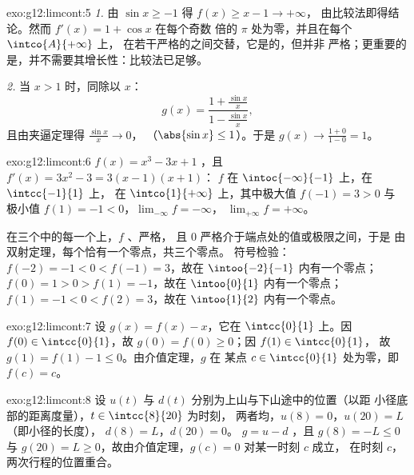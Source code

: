 \begin{solution}{exo:g12:limcont:5}
\emph{1.} 由 $\sin x \geq -1$ 得 $f(x) \geq x - 1 \to +\infty$，
由比较法即得结论。然而 $f'(x) = 1 + \cos x$ 在每个奇数
倍的 $\pi$ 处为零，并且在每个 $\intco{A}{+\infty}$ 上，
在若干严格的之间交替，它是的，但并非
严格；更重要的是，并不需要其增长性：比较法已足够。

\emph{2.} 当 $x > 1$ 时，同除以 $x$：
\[
g(x) = \frac{1 + \frac{\sin x}{x}}{1 - \frac{\sin x}{x}},
\]
且由夹逼定理得 $\frac{\sin x}{x} \to 0$，
（$\abs{\sin x} \leq 1$）。于是 $g(x) \to \frac{1+0}{1-0} = 1$。
\end{solution}

\begin{solution}{exo:g12:limcont:6}
$f(x) = x^3 - 3x + 1$ ，且 $f'(x) = 3x^2 - 3 = 3(x-1)(x+1)$：
$f$ 在 $\intoc{-\infty}{-1}$ 上，在 $\intcc{-1}{1}$ 上，
在 $\intco{1}{+\infty}$ 上，其中极大值 $f(-1) = 3 > 0$ 与
极小值 $f(1) = -1 < 0$，$\lim_{-\infty} f = -\infty$，
$\lim_{+\infty} f = +\infty$。

在三个中的每一个上，$f$ 、严格，
且 $0$ 严格介于端点处的值或极限之间，于是
由双射定理，每个恰有一个零点，共三个零点。
符号检验：$f(-2) = -1 < 0 < f(-1) = 3$，故在
$\intoo{-2}{-1}$ 内有一个零点；$f(0) = 1 > 0 > f(1) = -1$，故在 $\intoo{0}{1}$ 内有一个零点；
$f(1) = -1 < 0 < f(2) = 3$，故在 $\intoo{1}{2}$ 内有一个零点。
\end{solution}

\begin{solution}{exo:g12:limcont:7}
设 $g(x) = f(x) - x$，它在 $\intcc{0}{1}$ 上。因
$f(0) \in \intcc{0}{1}$，故 $g(0) = f(0) \geq 0$；因 $f(1) \in \intcc{0}{1}$，
故 $g(1) = f(1) - 1 \leq 0$。由介值定理，$g$ 在
某点 $c \in \intcc{0}{1}$ 处为零，即 $f(c) = c$。
\end{solution}

\begin{solution}{exo:g12:limcont:8}
设 $u(t)$ 与 $d(t)$ 分别为上山与下山途中的位置（以距
小径底部的距离度量），$t \in \intcc{8}{20}$ 为时刻，
两者均，$u(8) = 0$，$u(20) = L$（即小径的长度），
$d(8) = L$，$d(20) = 0$。 $g = u - d$ ，且
$g(8) = -L \leq 0$ 与 $g(20) = L \geq 0$，故由介值定理，$g(c) = 0$ 对某一时刻 $c$ 成立，
在时刻 $c$，两次行程的位置重合。
\end{solution}

